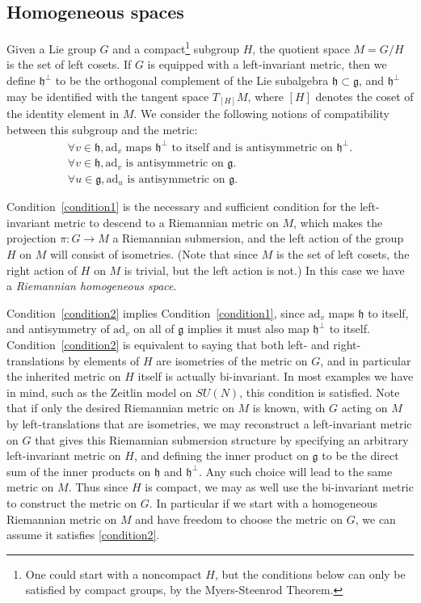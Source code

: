 \documentclass[oneside, 11pt]{amsart}
\numberwithin{equation}{section}
\newcommand{\ad}{\mathrm{ad}}
\newcommand{\hperp}{\mathfrak{h}^{\perp}}
\begin{document}
\subsection{Homogeneous spaces}\label{homogeneoussection}
 
Given a Lie group $G$ and a compact\footnote{One could start with a noncompact $H$, but the conditions below can only be satisfied by compact groups, by the Myers-Steenrod Theorem.} subgroup $H$, the quotient space $M=G/H$ is the set of left cosets. If $G$ is equipped with a left-invariant metric, then we define $\hperp$ to be the orthogonal complement of the Lie subalgebra $\mathfrak{h}\subset \mathfrak{g}$, and $\hperp$ may be identified with the tangent space $T_{[H]}M$, where $[H]$ denotes the coset of the identity element in $M$. We consider the following notions of compatibility between this subgroup and the metric:
\begingroup
\renewcommand\theequation{C\arabic{equation}}
\setcounter{equation}{0}
\begin{align}
    \forall v\in \mathfrak{h}, \ad_v \text{ maps $\hperp$ to itself and is antisymmetric on $\hperp$.} \label{condition1} \\
    \forall v\in\mathfrak{h}, \ad_v \text{ is antisymmetric on  $\mathfrak{g}$.} \label{condition2} \\ 
    \forall u\in\mathfrak{g}, \ad_u \text{ is antisymmetric on  $\mathfrak{g}$.} \label{condition3} 
\end{align}
\endgroup

Condition~\eqref{condition1} is the necessary and sufficient condition for the left-invariant metric to descend to a Riemannian metric on $M$, which makes the projection $\pi\colon G\to M$ a Riemannian submersion, and the left action of the group $H$ on $M$ will consist of isometries. (Note that since $M$ is the set of left cosets, the right action of $H$ on $M$ is trivial, but the left action is not.)
In this case we have a \emph{Riemannian homogeneous space}. 

Condition~\eqref{condition2} implies Condition~\eqref{condition1}, since $\ad_v$ maps $\mathfrak{h}$ to itself, and antisymmetry of $\ad_v$ on all of $\mathfrak{g}$ implies it must also map $\hperp$ to itself. Condition~\eqref{condition2} is equivalent to saying that both left- and right-translations by elements of $H$ are isometries of the metric on $G$, and in particular the inherited metric on $H$ itself is actually bi-invariant. In most examples we have in mind, such as the Zeitlin model on $SU(N)$, this condition is satisfied. Note that if only the desired Riemannian metric on $M$ is known, with $G$ acting on $M$ by left-translations that are isometries, we may reconstruct a left-invariant metric on $G$ that gives this Riemannian submersion structure by specifying an arbitrary left-invariant metric on $H$, and defining the inner product on $\mathfrak{g}$ to be the direct sum of the inner products on $\mathfrak{h}$ and $\hperp$. Any such choice will lead to the same metric on $M$. Thus since $H$ is compact, we may as well use the bi-invariant metric to construct the metric on $G$. In particular if we start with a homogeneous Riemannian metric on $M$ and have freedom to choose the metric on $G$, we can assume it satisfies \eqref{condition2}.
\end{document}

